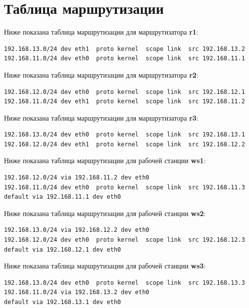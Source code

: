 \documentclass[a4paper,12pt]{article}
\begin{document}
\section{Таблица маршрутизации}

Ниже показана таблица маршрутизации для маршрутизатора \textbf{r1}:

\begin{Verbatim}
192.168.13.0/24 dev eth1  proto kernel  scope link  src 192.168.13.2 
192.168.11.0/24 dev eth0  proto kernel  scope link  src 192.168.11.1 
\end{Verbatim}

Ниже показана таблица маршрутизации для маршрутизатора \textbf{r2}:

\begin{Verbatim}
192.168.12.0/24 dev eth0  proto kernel  scope link  src 192.168.12.1 
192.168.11.0/24 dev eth1  proto kernel  scope link  src 192.168.11.2
\end{Verbatim}

Ниже показана таблица маршрутизации для маршрутизатора \textbf{r3}:

\begin{Verbatim}
192.168.13.0/24 dev eth0  proto kernel  scope link  src 192.168.13.1 
192.168.12.0/24 dev eth1  proto kernel  scope link  src 192.168.12.2
\end{Verbatim}

Ниже показана таблица маршрутизации для рабочей станции \textbf{ws1}:

\begin{Verbatim}
192.168.12.0/24 via 192.168.11.2 dev eth0 
192.168.11.0/24 dev eth0  proto kernel  scope link  src 192.168.11.3 
default via 192.168.11.1 dev eth0
\end{Verbatim}

Ниже показана таблица маршрутизации для рабочей станции \textbf{ws2}:

\begin{Verbatim}
192.168.13.0/24 via 192.168.12.2 dev eth0 
192.168.12.0/24 dev eth0  proto kernel  scope link  src 192.168.12.3 
default via 192.168.12.1 dev eth0
\end{Verbatim}

Ниже показана таблица маршрутизации для рабочей станции \textbf{ws3}:

\begin{Verbatim}
192.168.13.0/24 dev eth0  proto kernel  scope link  src 192.168.13.3 
192.168.11.0/24 via 192.168.13.2 dev eth0 
default via 192.168.13.1 dev eth0
\end{Verbatim}
\end{document}

